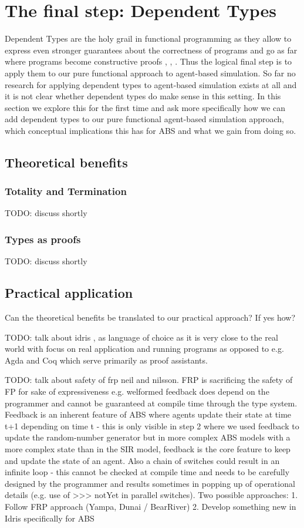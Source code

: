 \section{The final step: Dependent Types}
Dependent Types are the holy grail in functional programming as they allow to express even stronger guarantees about the correctness of programs and go as far where programs become constructive proofs \cite{altenkirch_why_2005}, \cite{altenkirch_pi_sigma:_2010}, \cite{program_homotopy_2013}. Thus the logical final step is to apply them to our pure functional approach to agent-based simulation.
So far no research for applying dependent types to agent-based simulation exists at all and it is not clear whether dependent types do make sense in this setting.
In this section we explore this for the first time and ask more specifically how we can add dependent types to our pure functional agent-based simulation approach, which conceptual implications this has for ABS and what we gain from doing so.

\subsection{Theoretical benefits}
\subsubsection{Totality and Termination}
TODO: discuss shortly

\subsubsection{Types as proofs}
TODO: discuss shortly

\subsection{Practical application}
Can the theoretical benefits be translated to our practical approach? If yes how?

TODO: talk about idris \cite{brady_idris_2013}, \cite{brady_type-driven_2017} as language of choice as it is very close to the real world with focus on real application and running programs as opposed to e.g. Agda and Coq which serve primarily as proof assistants.

TODO: talk about safety of frp neil and nilsson. FRP is sacrificing the safety of FP for sake of expressiveness e.g. welformed feedback does depend on the programmer and cannot be guaranteed at compile time through the type system. Feedback is an inherent feature of ABS where agents update their state at time t+1 depending on time t - this is only visible in step 2 where we used feedback to update the random-number generator but in more complex ABS models with a more complex state than in the SIR model, feedback is the core feature to keep and update the state of an agent. 
Also a chain of switches could result in an infinite loop - this cannot be checked at compile time and needs to be carefully designed by the programmer and results sometimes in popping up of operational details (e.g. use of >>> notYet in parallel switches).
Two possible approaches:
1. Follow FRP approach (Yampa, Dunai / BearRiver) 
2. Develop something new in Idris specifically for ABS


